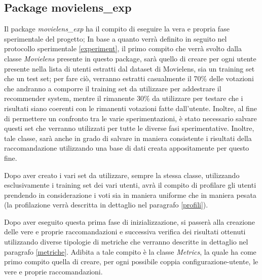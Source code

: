 \subsection{Package movielens\_exp}
Il package \emph{movielens\_exp} ha il compito di eseguire la vera e propria fase sperimentale del progetto; In base a quanto verrà definito in seguito nel protocollo sperimentale \ref{experiment},
il primo compito che verrà svolto dalla classe \emph{Movielens} presente in questo package, sarà quello di creare per ogni utente presente nella lista di utenti estratti dal dataset di Movielens, sia un training set che un test set; per fare ciò, verranno estratti casualmente il 70\% delle votazioni che andranno a comporre il training set da utilizzare per addestrare il recommender system, mentre il rimanente 30\% da utilizzare per testare che i risultati siano coerenti con le rimanenti votazioni fatte dall'utente. Inoltre, al fine di permettere un confronto tra le varie sperimentazioni, è stato necessario salvare questi set che verranno utilizzati per tutte le diverse fasi sperimentative. Inoltre, tale classe, sarà anche in grado di salvare in maniera consistente i risultati della raccomandazione utilizzando una base di dati creata appositamente per questo fine.

Dopo aver creato i vari set da utilizzare, sempre la stessa classe, utilizzando esclusivamente i training set dei vari utenti, avrà il compito di profilare gli utenti prendendo in considerazione i voti sia in maniera uniforme che in maniera pesata (la profilazione verrà descritta in dettaglio nel paragrafo \ref{profili}).

Dopo aver eseguito questa prima fase di inizializzazione, si passerà alla creazione delle vere e proprie raccomandazioni e successiva verifica dei risultati ottenuti utilizzando diverse tipologie di metriche che verranno descritte in dettaglio nel paragrafo \ref{metriche}. Adibita a tale compito è la classe \emph{Metrics}, la quale ha come primo compito quella di creare, per ogni possibile coppia configurazione-utente, le vere e proprie raccomandazioni.

